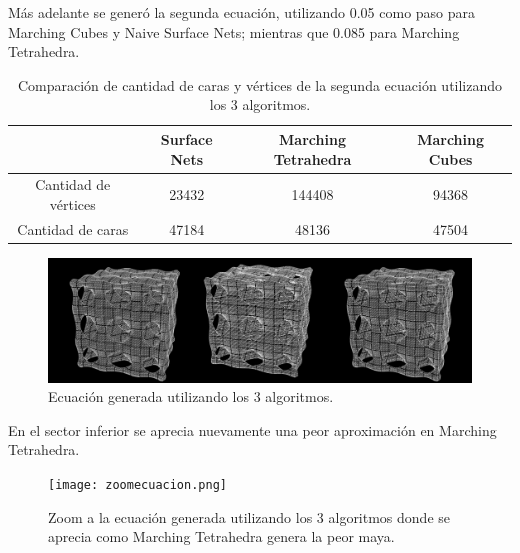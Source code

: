 \documentclass[12pt]{article}
\begin{document}
Más adelante se generó la segunda ecuación, utilizando 0.05 como paso para Marching Cubes y Naive Surface Nets; mientras que 0.085 para Marching Tetrahedra.
\begin{table}[h!]
  \centering
  \label{tab:table1}
  \begin{tabular}{cccc}
    \toprule
    & Surface Nets & Marching Tetrahedra & Marching Cubes\\
    \midrule
    Cantidad de vértices & 23432 & 144408  & 94368 \\
    Cantidad de caras &  47184 & 48136 & 47504 \\
    \bottomrule
  \end{tabular}
  \caption{Comparación de cantidad de caras y vértices de la segunda ecuación utilizando los 3 algoritmos.}
\end{table}
\begin{figure}[h!]
\includegraphics[width=\linewidth,center]{ecuacion2.png}
\caption{Ecuación generada utilizando los 3 algoritmos.}
\end{figure}

En el sector inferior se aprecia nuevamente una peor aproximación en Marching Tetrahedra.
\begin{figure}[h!]
\texttt{[image: zoomecuacion.png]}
\caption{Zoom a la ecuación generada utilizando los 3 algoritmos donde se aprecia como Marching Tetrahedra genera la peor maya.}
\end{figure}
\end{document}
